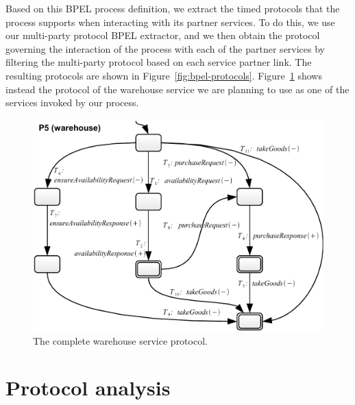 Based on this BPEL process definition, we extract the timed protocols that the process supports when interacting with its partner services.
To do this, we use our multi-party protocol BPEL extractor, and we then obtain the protocol governing the interaction of the process with each of the partner services by filtering the multi-party protocol based on each service partner link.
The resulting protocols are shown in Figure~\ref{fig:bpel-protocols}.
Figure~\ref{fig:bpel-complete-warehouse} shows instead the protocol of the warehouse service we are planning to use as one of the services invoked by our process.

\begin{figure}[tbhp]
    \centering
    \includegraphics[width=\textwidth]{content/sample-usecase/bpel-warehouse-protocol}
    \caption{The complete warehouse service protocol.}
    \label{fig:bpel-complete-warehouse}
\end{figure}


\section{Protocol analysis}


